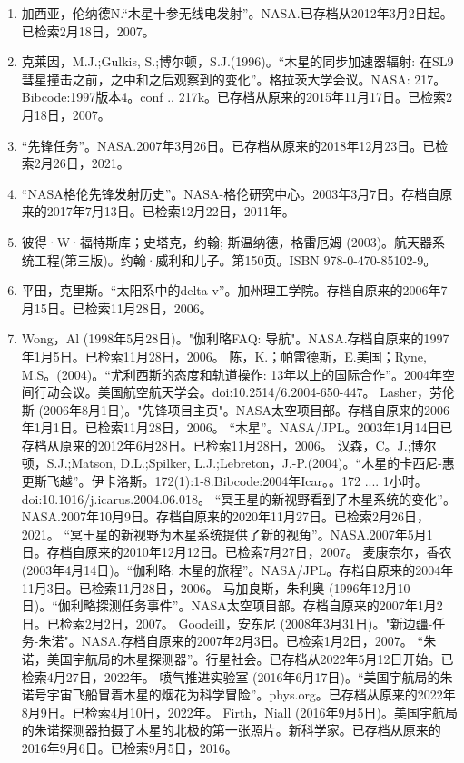 \begin{enumerate}
\item 加西亚，伦纳德N.“木星十参无线电发射”。NASA.已存档从2012年3月2日起。已检索2月18日，2007。
\item 克莱因，M.J.;Gulkis, S.;博尔顿，S.J.(1996)。“木星的同步加速器辐射: 在SL9彗星撞击之前，之中和之后观察到的变化”。格拉茨大学会议。NASA: 217。Bibcode:1997版本4。conf .. 217k。已存档从原来的2015年11月17日。已检索2月18日，2007。
\item “先锋任务”。NASA.2007年3月26日。已存档从原来的2018年12月23日。已检索2月26日，2021。
\item “NASA格伦先锋发射历史”。NASA-格伦研究中心。2003年3月7日。存档自原来的2017年7月13日。已检索12月22日，2011年。
\item 彼得·W·福特斯库；史塔克，约翰; 斯温纳德，格雷厄姆 (2003)。航天器系统工程(第三版)。约翰·威利和儿子。第150页。ISBN 978-0-470-85102-9。
\item 平田，克里斯。“太阳系中的delta-v”。加州理工学院。存档自原来的2006年7月15日。已检索11月28日，2006。
\item Wong，Al (1998年5月28日)。"伽利略FAQ: 导航"。NASA.存档自原来的1997年1月5日。已检索11月28日，2006。
 陈，K.；帕雷德斯，E.美国；Ryne, M.S。(2004)。“尤利西斯的态度和轨道操作: 13年以上的国际合作”。2004年空间行动会议。美国航空航天学会。doi:10.2514/6.2004-650-447。
 Lasher，劳伦斯 (2006年8月1日)。"先锋项目主页"。NASA太空项目部。存档自原来的2006年1月1日。已检索11月28日，2006。
 “木星”。NASA/JPL。2003年1月14日已存档从原来的2012年6月28日。已检索11月28日，2006。
 汉森，C。J.;博尔顿，S.J.;Matson, D.L.;Spilker, L.J.;Lebreton，J.-P.(2004)。“木星的卡西尼-惠更斯飞越”。伊卡洛斯。172(1):1-8.Bibcode:2004年Icar。。172 .... 1小时。doi:10.1016/j.icarus.2004.06.018。
 “冥王星的新视野看到了木星系统的变化”。NASA.2007年10月9日。存档自原来的2020年11月27日。已检索2月26日，2021。
 “冥王星的新视野为木星系统提供了新的视角”。NASA.2007年5月1日。存档自原来的2010年12月12日。已检索7月27日，2007。
 麦康奈尔，香农 (2003年4月14日)。“伽利略: 木星的旅程”。NASA/JPL。存档自原来的2004年11月3日。已检索11月28日，2006。
 马加良斯，朱利奥 (1996年12月10日)。“伽利略探测任务事件”。NASA太空项目部。存档自原来的2007年1月2日。已检索2月2日，2007。
 Goodeill，安东尼 (2008年3月31日)。"新边疆-任务-朱诺"。NASA.存档自原来的2007年2月3日。已检索1月2日，2007。
 “朱诺，美国宇航局的木星探测器”。行星社会。已存档从2022年5月12日开始。已检索4月27日，2022年。
 喷气推进实验室 (2016年6月17日)。“美国宇航局的朱诺号宇宙飞船冒着木星的烟花为科学冒险”。phys.org。已存档从原来的2022年8月9日。已检索4月10日，2022年。
 Firth，Niall (2016年9月5日)。美国宇航局的朱诺探测器拍摄了木星的北极的第一张照片。新科学家。已存档从原来的2016年9月6日。已检索9月5日，2016。

\end{enumerate}

